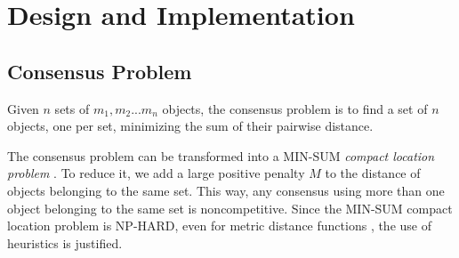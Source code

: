 \documentclass[10pt,letterpaper]{article}
\begin{document}





\newpage
\section*{Design and Implementation}

\subsection*{Consensus Problem}

Given $n$ sets of $ m_1, m_2... m_n$ objects, the consensus problem is to find a set of $n$ objects, one per set, minimizing the sum of their pairwise distance.

\noindent The consensus problem can be transformed into a MIN-SUM \textit{compact location problem} \cite{compact_location}. To reduce it, we add a large positive penalty $M$ to the distance of objects belonging to the same set. This way, any consensus using more than one object belonging to the same set is noncompetitive. Since the MIN-SUM compact location problem is NP-HARD, even for metric distance functions \cite{compact_location}, the use of heuristics is justified.





\end{document}
